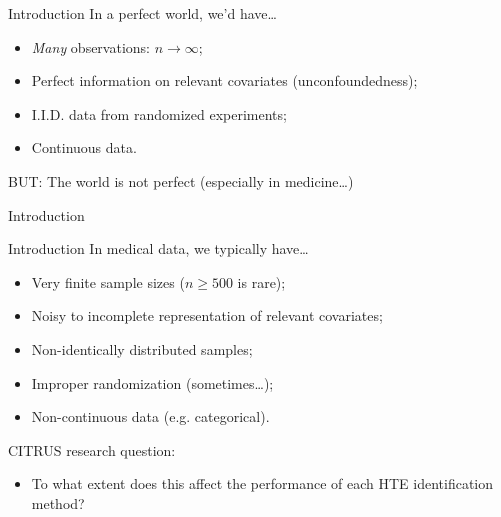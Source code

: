 \documentclass[11pt]{beamer}
\begin{document}
\begin{frame}{Introduction}
In a \alert{perfect} world, we'd have\dots \bigskip

\begin{itemize}\setlength\itemsep{1em}
	\item \textit{Many} observations: $n \to \infty$;
	\item Perfect information on relevant covariates (unconfoundedness);
	\item I.I.D. data from randomized experiments;
	\item Continuous data.
\end{itemize}

\bigskip
BUT: The world is \alert{not} perfect (especially in medicine\dots)
\end{frame}


\begin{frame}{Introduction}
	\begin{figure}
	\end{figure}
\end{frame}


\begin{frame}{Introduction}
In medical data, we typically have\dots \bigskip

\begin{itemize}\setlength\itemsep{1em}
	\item Very finite sample sizes ($n\geq 500$ is rare); 
	\item Noisy to incomplete representation of relevant covariates;
	\item Non-identically distributed samples;
	\item Improper randomization (sometimes\dots);
	\item Non-continuous data (e.g. categorical).
\end{itemize}
\bigskip

\alert{CITRUS research question:}
\begin{itemize}
	\item To what extent does this affect the performance of each HTE identification method?
\end{itemize}
\end{frame}
\end{document}

